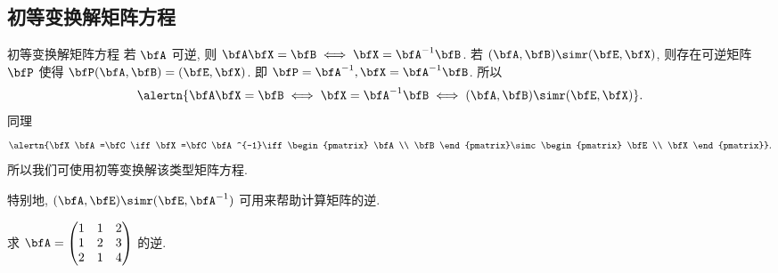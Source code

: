 \subsection{初等变换解矩阵方程}

\begin{frame}{初等变换解矩阵方程}
	\onslide<+->
	若 $\bfA$ 可逆, 则 $\bfA\bfX=\bfB\iff \bfX=\bfA^{-1}\bfB$.
	\onslide<+->
	若 $(\bfA,\bfB)\simr (\bfE,\bfX)$, 则存在可逆矩阵 $\bfP$ 使得 $\bfP(\bfA,\bfB)=(\bfE,\bfX)$.
	\onslide<+->
	即 $\bfP=\bfA^{-1},\bfX=\bfA^{-1}\bfB$.
	\onslide<+->
	所以
	\[\alertn{\bfA\bfX=\bfB\iff \bfX=\bfA^{-1}\bfB\iff (\bfA,\bfB)\simr (\bfE,\bfX)}.\]	
	\onslide<+->
	同理
	\[\alertn{\bfX\bfA=\bfC\iff \bfX=\bfC\bfA^{-1}\iff\begin{pmatrix}
		\bfA\\
		\bfB
	\end{pmatrix}\simc\begin{pmatrix}
		\bfE\\
		\bfX
	\end{pmatrix}}.\]
	\onslide<+->
	所以我们可使用初等变换解该类型矩阵方程.
	
	\onslide<+->
	特别地, \alert{$(\bfA,\bfE)\simr(\bfE,\bfA^{-1})$} 可用来帮助计算矩阵的逆.
	\onslide<+->
	\begin{example}
		求 $\bfA=\begin{pmatrix}
			1&1&2\\1&2&3\\2&1&4
		\end{pmatrix}$ 的逆.
	\end{example}
\end{frame}


